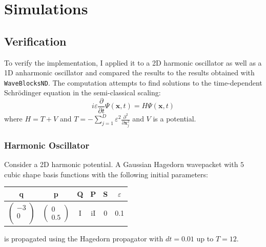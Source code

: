 
\chapter{Simulations} %

\label{Chapter4} %



\section{Verification}
To verify the implementation, I applied it to a 2D harmonic oscillator as well as a 1D anharmonic oscillator and compared the results to the results obtained with \texttt{WaveBlocksND}.
The computation attempts to find solutions to the time-dependent Schr\"odinger equation in
the semi-classical scaling:
\begin{equation}
i \varepsilon \frac{\partial}{\partial t}\Psi(\mathbf{x},t) = H \Psi(\mathbf{x},t)
\end{equation}
where $H = T + V$ and $T = -\sum\limits_{j=1}^D \varepsilon^2 \frac{\partial^2}{\partial \mathbf{x}^2_j}$ and $V$ is a potential.

\subsection{Harmonic Oscillator}
Consider a 2D harmonic potential.
A Gaussian Hagedorn wavepacket with $5$ cubic shape basis functions with the following initial parameters:
\begin{center}
 \begin{tabular}{|c c c c c c|} 
 \hline
 q & p & Q & P & S & $\varepsilon$\\ [0.5ex] 
 \hline
 $\begin{pmatrix}
 -3\\
 0\\
 \end{pmatrix}$ & $\begin{pmatrix} 0 \\ 0.5 \end{pmatrix}$ & I & iI & 0 & 0.1\\ 
 \hline
\end{tabular}
\end{center}
is propagated using the Hagedorn propagator with $dt = 0.01$ up to $T = 12$.


